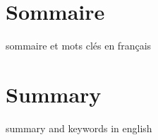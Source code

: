 \documentclass[12pt,initial,twoside,maitrise]{dms}
\numberwithin{equation}{section}
\numberwithin{table}{chapter}
\numberwithin{figure}{chapter}
\begin{document}


\francais{}

\chapter*{Sommaire}
sommaire et mots clés en français


\anglais{}
\chapter*{Summary}

summary and keywords in english


\anglais%
\cleardoublepage%
\tableofcontents
\cleardoublepage%
\listoftables
\cleardoublepage%
%
\listoffigures

\end{document}
